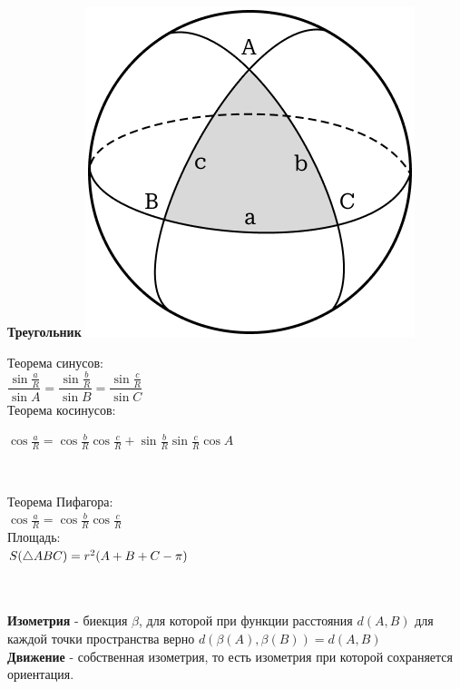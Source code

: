     \begin{minipage}[t]{0.25\textwidth}
        \begin{center}
            \textbf{Треугольник}
            \includegraphics[width=0.75\linewidth]{images/img4}\\
        \end{center}
        Теорема синусов:\\
        $\dfrac{\sin\frac{a}{R}}{\sin A} = \dfrac{\sin\frac{b}{R}}{\sin B} = \dfrac{\sin\frac{c}{R}}{\sin C}$\\

        Теорема косинусов:
        \begin{spacing}{1.2}
            $\cos\frac{a}{R} = \cos\frac{b}{R}\cos\frac{c}{R} + \sin\frac{b}{R}\sin\frac{c}{R}\cos A$
        \end{spacing}\

        Теорема Пифагора:\\
        $\cos\frac{a}{R}=\cos\frac{b}{R}\cos\frac{c}{R}$\\

        Площадь:\\
        $S(\triangle ABC)=\\r^2(A + B + C - \pi)$

    \end{minipage}\\ \ \\

    \textbf{Изометрия} - биекция $\beta$, для которой при функции расстояния $d(A, B)$ для каждой точки
    пространства верно $d(\beta(A), \beta(B)) = d(A, B)$\\

    \textbf{Движение} - собственная изометрия, то есть изометрия при которой сохраняется ориентация.


